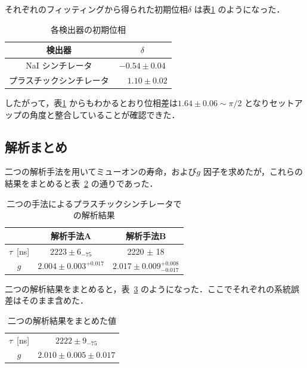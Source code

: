 それぞれのフィッティングから得られた初期位相$\delta$ は表\ref{tab:InitPhases} のようになった．

\begin{table}[h]
	\centering
	\caption{各検出器の初期位相}
	\begin{tabular}{cc}\toprule
	検出器 & $\delta$ \\ \midrule
	NaI シンチレータ & $-0.54 \pm 0.04$ \\
	プラスチックシンチレータ & $\phantom{-}1.10 \pm 0.02$ \\ \bottomrule
	\end{tabular}\label{tab:InitPhases}
\end{table}%
したがって，表\ref{tab:InitPhases} からもわかるとおり位相差は$1.64 \pm 0.06 \sim \pi / 2$ となりセットアップの角度と整合していることが確認できた．

\subsection{解析まとめ}
\label{subsec:PSmatome}
二つの解析手法を用いてミューオンの寿命，および$g$ 因子を求めたが，これらの結果をまとめると表~\ref{tab:matome_PS} の通りであった．
\begin{table}[H]
	\centering
	\caption{二つの手法によるプラスチックシンチレータでの解析結果}
	\begin{tabular}{ccc}\toprule
	{} & 解析手法A & 解析手法B \\ \midrule
	$\tau$~[ns]& $2223 \pm 6_{- 75}$ & 2220 $\pm$ 18\\
	$g$ & $2.004 \pm 0.003^{+0.017}$  & $2.017 \pm 0.009 ^{+0.008}_{-0.017}$\\ \bottomrule
	\end{tabular}\label{tab:matome_PS}
\end{table}%

二つの解析結果をまとめると，表~\ref{tab:matome_PS2} のようになった．ここでそれぞれの系統誤差はそのまま含めた．

\begin{table}[H]
	\centering
	\caption{二つの解析結果をまとめた値}
	\begin{tabular}{cc}\toprule
	$\tau$~[ns]& $2222 \pm 9_{-75}$\\
	$g$ & $2.010 \pm 0.005 \pm 0.017$\\ \bottomrule
	\end{tabular}\label{tab:matome_PS2}
\end{table}%

%
